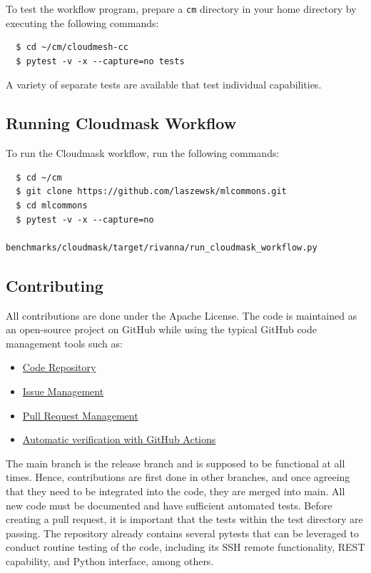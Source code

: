 \documentclass[sigplan,screen]{acmart}
\newcommand{\FILE}[1]{}
\begin{document}
To test the workflow program, prepare a {\scriptsize \verb|cm|}
directory in your home directory by executing the following commands:

{\scriptsize\begin{verbatim}
  $ cd ~/cm/cloudmesh-cc
  $ pytest -v -x --capture=no tests
\end{verbatim}}

A variety of separate tests are available that test individual
capabilities.


% 

\FILE{cloudmask-appendix.tex}

\subsection{Running Cloudmask Workflow}\label{sec:running-cloudmask}

To run the Cloudmask workflow, run the following commands:

{\scriptsize\begin{verbatim}
  $ cd ~/cm
  $ git clone https://github.com/laszewsk/mlcommons.git
  $ cd mlcommons
  $ pytest -v -x --capture=no
           benchmarks/cloudmask/target/rivanna/run_cloudmask_workflow.py
\end{verbatim}}


% 

\FILE{contributing.tex}

\subsection{Contributing}\label{contributing}

All contributions are done under the Apache License. The code is
maintained as an open-source project on GitHub while using the typical
GitHub code management tools such as:

\begin{itemize}
\item
  \href{https://github.com/cloudmesh/cloudmesh-cc}{Code Repository}
\item
  \href{https://github.com/cloudmesh/cloudmesh-cc/issues}{Issue Management}
\item
  \href{https://github.com/cloudmesh/cloudmesh-cc/pulls}{Pull Request Management}
\item
  \href{https://github.com/cloudmesh/cloudmesh-cc/actions}{Automatic verification with GitHub Actions}
\end{itemize}

The main branch is the release branch and is supposed to be functional
at all times. Hence, contributions are first done in other branches,
and once agreeing that they need to be integrated into the code, they
are merged into main. All new code must be documented and have
sufficient automated tests. Before creating a pull request, it is
important that the tests within the test directory are passing. The
repository already contains several pytests that can be leveraged to
conduct routine testing of the code, including its SSH remote
functionality, REST capability, and Python interface, among others.
\end{document}
